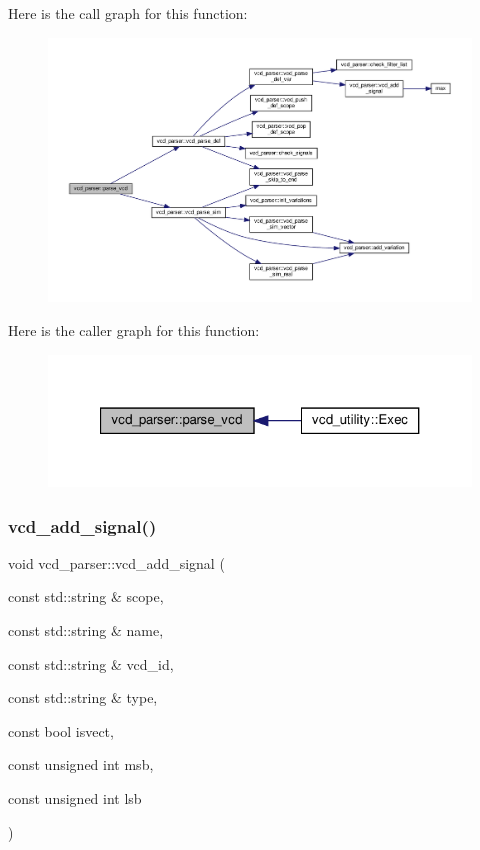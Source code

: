 Here is the call graph for this function\+:
\nopagebreak
\begin{figure}[H]
\begin{center}
\leavevmode
\includegraphics[width=350pt]{d2/d25/classvcd__parser_ad8b4e2abd642bf137a99ea67ea139e95_cgraph}
\end{center}
\end{figure}
Here is the caller graph for this function\+:
\nopagebreak
\begin{figure}[H]
\begin{center}
\leavevmode
\includegraphics[width=321pt]{d2/d25/classvcd__parser_ad8b4e2abd642bf137a99ea67ea139e95_icgraph}
\end{center}
\end{figure}
\mbox{\label{classvcd__parser_a044276a15d40eb898d7b34584c11776c}} 
\subsubsection{\texorpdfstring{vcd\+\_\+add\+\_\+signal()}{vcd\_add\_signal()}}
{\footnotesize\ttfamily void vcd\+\_\+parser\+::vcd\+\_\+add\+\_\+signal (\begin{DoxyParamCaption}\item[{const std\+::string \&}]{scope,  }\item[{const std\+::string \&}]{name,  }\item[{const std\+::string \&}]{vcd\+\_\+id,  }\item[{const std\+::string \&}]{type,  }\item[{const bool}]{isvect,  }\item[{const unsigned int}]{msb,  }\item[{const unsigned int}]{lsb }\end{DoxyParamCaption})\hspace{0.3cm}{\ttfamily [private]}}



